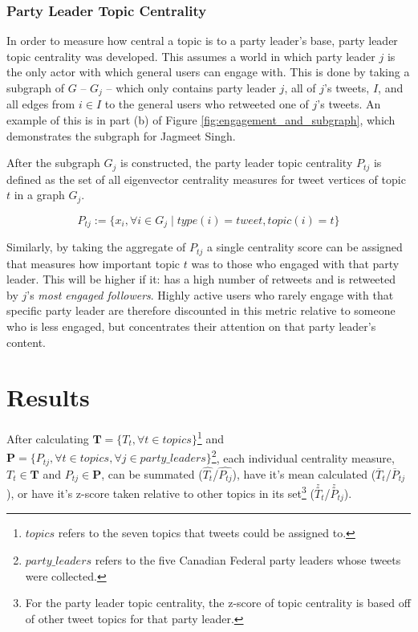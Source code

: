 \subsubsection{Party Leader Topic Centrality}

In order to measure how central a topic is to a party leader's base, party
leader topic centrality was developed. This assumes a world in which party
leader $j$ is the only actor with which general users can engage with. This is
done by taking a subgraph of $G$ -- $G_{j}$ -- which only contains party leader
$j$, all of $j$'s tweets, $I$, and all edges from $i\in I$ to the general users
who retweeted one of $j$'s tweets. An example of this is in part (b) of Figure
\ref{fig:engagement_and_subgraph}, which demonstrates the subgraph for Jagmeet
Singh. 

After the subgraph $G_j$ is constructed, the party leader topic
centrality $P_{tj}$ is defined as the set of all eigenvector centrality measures
for tweet vertices of topic $t$ in a graph $G_{j}$.

\begin{equation}
    P_{tj} := \{ x_i ,  \forall i \in G_{j} \mid type(i)=tweet, topic(i)=t \}
\end{equation}

Similarly, by taking the aggregate of $P_{tj}$ a single centrality score can be
assigned that measures how important topic $t$ was to those who engaged with
that party leader. This will be higher if it: has a high number of retweets
and is retweeted by $j$'s \emph{most engaged followers}. Highly active users who
rarely engage with that specific party leader are therefore discounted in this
metric relative to someone who is less engaged, but concentrates their attention
on that party leader's content. 

\section{Results}

After calculating $\textbf{T}=\{T_{t}, \forall t \in topics\}$\footnote{$topics$
refers to the seven topics that tweets could be assigned to.} and
$\textbf{P}=\{P_{tj}, \forall t \in topics,\forall j \in
party\_leaders\}$\footnote{$party\_leaders$ refers to the five Canadian Federal
party leaders whose tweets were collected.}, each individual centrality measure,
$T_{t} \in \textbf{T}$ and $P_{tj}\in \textbf{P}$, can be summated
($\hat{T_{t}}$/$\hat{P_{tj}}$), have it's mean calculated
($\overline{T}_{t}$/$\overline{P}_{tj}$), or have it's z-score taken relative to
other topics in its set\footnote{For the party leader topic centrality, the
z-score of topic centrality is based off of other tweet topics for that party
leader.} ($\stackrel{z}{T}_{t}$/$\stackrel{z}{P}_{tj}$).

